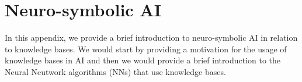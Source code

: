 

%
\chapter*{\thechapter \quad Neuro-symbolic AI}
\label{appendixB}
In this appendix, we provide a brief introduction to neuro-symbolic AI in relation to knowledge bases.
We would start by providing a motivation for the usage of knowledge bases in AI and then we would
provide a brief introduction to the Neural Neutwork algorithms (NNs) that use knowledge bases.



